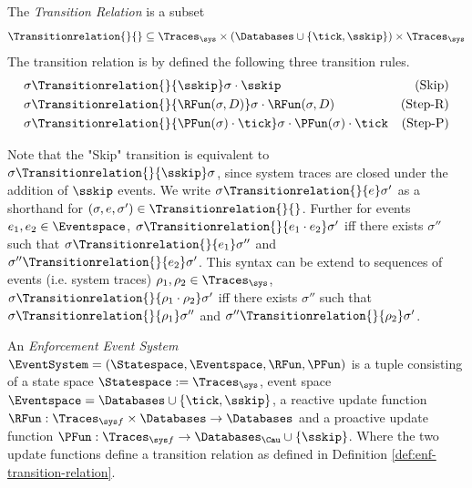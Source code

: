 \begin{definition}
    \label{def:enf-transition-relation}
    The \emph{Transition Relation} is a subset
    \begin{equation*}
        \Transitionrelation{}{} \subseteq
        \Traces_\sys
        \times \left( \Databases \cup \left\{\tick, \sskip \right\} \right)
        \times \Traces_\sys
    \end{equation*}
    The transition relation is by defined  the following three transition
    rules.
    \begin{align*}
        \sigma &\Transitionrelation{}{\sskip} \sigma \cdot \sskip
            & \text{(Skip)} \\
        \sigma &\Transitionrelation{}{\RFun(\sigma, D)} \sigma \cdot \RFun(\sigma, D)
            & \text{(Step-R)} \\
        \sigma &\Transitionrelation{}{\PFun(\sigma) \cdot \tick}
            \sigma \cdot \PFun(\sigma) \cdot \tick
            & \text{(Step-P)}
    \end{align*}
\end{definition}
Note that the "Skip" transition is equivalent to
$\sigma \Transitionrelation{}{\sskip} \sigma$, since system traces
are closed under the addition of $\sskip$ events.
We write $\sigma \Transitionrelation{}{e} \sigma'$
as a shorthand for
$\left(\sigma, e, \sigma'\right) \in \Transitionrelation{}{}$.
Further for events $e_1, e_2 \in \Eventspace$,
$\sigma \Transitionrelation{}{e_1 \cdot e_2} \sigma'$ iff
there exists $\sigma''$ such that
$\sigma \Transitionrelation{}{e_1} \sigma''$ and
$\sigma'' \Transitionrelation{}{e_2} \sigma'$.
This syntax can be extend to sequences of events (i.e. system traces)
$\rho_1, \rho_2 \in \Traces_\sys$,
$\sigma \Transitionrelation{}{\rho_1 \cdot \rho_2} \sigma'$ iff
there exists $\sigma''$ such that
$\sigma \Transitionrelation{}{\rho_1} \sigma''$ and
$\sigma'' \Transitionrelation{}{\rho_2} \sigma'$.

\begin{definition}
    \label{def:enforcement-event-system}
    An \emph{Enforcement Event System} 
    $\EventSystem = \left(\Statespace, \Eventspace, \RFun, \PFun \right)$
    is a tuple consisting of a state space $\Statespace := \Traces_\sys$,
    event space $\Eventspace = \Databases \cup \left\{ \tick, \sskip \right\}$,
    a reactive update function
    $\RFun : \Traces_{\sys f} \times \Databases \to \Databases$
    and a proactive update function
    $\PFun : \Traces_{\sys f} \to \Databases_\Cau \cup \left\{ \sskip \right\}$.
    Where the two update functions define a transition relation as 
    defined in Definition \ref{def:enf-transition-relation}.
\end{definition}

